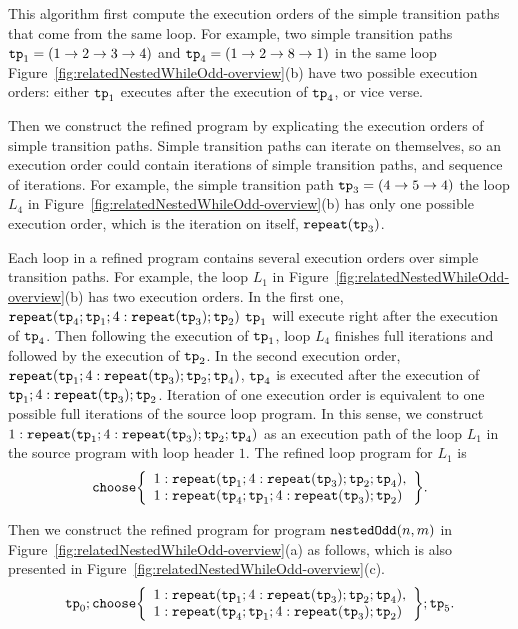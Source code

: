 This algorithm first compute the execution orders of
the simple transition paths that come from the same loop.
For example, two simple transition paths $\mathtt{tp}_1 = (1 \to 2 \to 3 \to 4)$ and 
$\mathtt{tp}_4 = (1 \to 2 \to 8 \to 1)$ in the same loop Figure~\ref{fig:relatedNestedWhileOdd-overview}(b) have two possible execution orders:
either $\mathtt{tp}_1$ executes after the execution of $\mathtt{tp}_4$, or vice verse.

Then we construct the refined program by explicating the execution orders of simple transition paths.
Simple transition paths can iterate on themselves, so an execution order could
contain iterations of simple transition paths, and sequence of iterations.
For example, the simple transition path $\mathtt{tp}_3 = (4 \to 5 \to 4)$
the loop $L_4$ in Figure~\ref{fig:relatedNestedWhileOdd-overview}(b) has only one possible execution order,
which is the iteration on itself, $\mathtt{repeat}(\mathtt{tp}_3)$.

Each loop in a refined program contains several execution orders over simple transition paths.
For example, the loop $L_1$ in Figure~\ref{fig:relatedNestedWhileOdd-overview}(b)
has two execution orders. In the first one,
$\mathtt{repeat}(\mathtt{tp}_4; \mathtt{tp}_1; 4:\mathtt{repeat}(\mathtt{tp}_3); \mathtt{tp}_2)$ 
$\mathtt{tp}_1$ will execute right after the execution of $\mathtt{tp}_4$.
Then following the execution of $\mathtt{tp}_1$, loop $L_4$ finishes full iterations and followed by the execution of $\mathtt{tp}_2$.
In the second execution order,
$\mathtt{repeat}(\mathtt{tp}_1; 4:\mathtt{repeat}(\mathtt{tp}_3); \mathtt{tp}_2; \mathtt{tp}_4)$,
$\mathtt{tp}_4$ is executed after the execution of $\mathtt{tp}_1; 4:\mathtt{repeat}(\mathtt{tp}_3); \mathtt{tp}_2$.
Iteration of one execution order is equivalent to one possible full iterations of the source loop program.
In this sense, we construct $1: \mathtt{repeat}(\mathtt{tp}_1; 4:\mathtt{repeat}(\mathtt{tp}_3); \mathtt{tp}_2; \mathtt{tp}_4)$ as an execution path of the loop $L_1$ in the source program with loop header $1$.
The refined loop program for $L_1$ is 
\[
\rpchoose{ 
 \begin{array}{l}
 1: \rprepeat(\tpath_1; 4:\rprepeat(\tpath_3); \tpath_2; \tpath_4), \\
 1: \rprepeat(\tpath_4; \tpath_1; 4:\rprepeat(\tpath_3); \tpath_2) 
 \end{array}
 }.
\]

Then we construct the refined program for program $\mathtt{nestedOdd}(n, m)$ in Figure~\ref{fig:relatedNestedWhileOdd-overview}(a) as follows, which is also presented in Figure~\ref{fig:relatedNestedWhileOdd-overview}(c).
\[
 \tpath_0 ; \rpchoose{ 
 \begin{array}{l}
    1: \rprepeat(\tpath_1; 4:\rprepeat(\tpath_3); \tpath_2; \tpath_4), \\
    1: \rprepeat(\tpath_4; \tpath_1; 4:\rprepeat(\tpath_3); \tpath_2) 
 \end{array}
 }; \tpath_5.
\]

